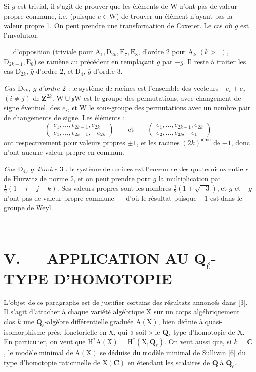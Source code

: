 \documentclass[11pt,leqno]{article}
\newcommand{\Page}[1]{\ifvmode\noindent\else\unskip\ \fi{\footnotesize\textcolor{gray}{[p.\,#1]}}\ \ignorespaces}
\begin{document}
Si \(\bar{g}\) est trivial, il s’agit de prouver que les éléments de \(\mathrm{W}\) n’ont pas de valeur propre commune, i.e. (puisque \(e\in\mathrm{W}\)) de trouver un élément n’ayant pas la valeur propre 1. On peut prendre une transformation de Coxeter. Le cas où \(\bar{g}\) est l’involution

\Page{233}
d’opposition (triviale pour \(\mathrm{A}_1,\mathrm{D}_{2k},\mathrm{E}_7,\mathrm{E}_8\), d’ordre \(2\) pour \(\mathrm{A}_k\) \((k>1)\), \(\mathrm{D}_{2k+1},\mathrm{E}_6\)) se ramène au précédent en remplaçant \(g\) par \(-g\). Il reste à traiter les cas \(\mathrm{D}_{2k}\), \(\bar g\) d’ordre \(2\), et \(\mathrm{D}_4\), \(\bar g\) d’ordre \(3\).

\textit{Cas \(\mathrm{D}_{2k}\), \(\bar g\) d’ordre \(2\)} : le système de racines est l’ensemble des vecteurs \(\pm e_i\pm e_j\) \((i\ne j)\) de \(\mathbf{Z}^{2k}\), \(\mathrm{W}\cup g\mathrm{W}\) est le groupe des permutations, avec changement de signe éventuel, des \(e_i\), et \(\mathrm{W}\) le sous-groupe des permutations avec un nombre pair de changements de signe. Les éléments :
\[
\left(
\begin{array}{l}
e_1,\ldots,e_{2k-1},e_{2k}\\
e_1,\ldots,e_{2k-1},-e_{2k}
\end{array}
\right)
\qquad\text{et}\qquad
\left(
\begin{array}{l}
e_1,\ldots,e_{2k-1},e_{2k}\\
e_2,\ldots,e_{2k},-e_1
\end{array}
\right)
\]
ont respectivement pour valeurs propres \(\pm1\), et les racines \((2k)^{\text{ième}}\) de \(-1\), donc n’ont aucune valeur propre en commun.

\textit{Cas \(\mathrm{D}_4\), \(\bar g\) d’ordre \(3\)} : le système de racines est l’ensemble des quaternions entiers de Hurwitz de norme \(2\), et on peut prendre pour \(g\) la multiplication par \(\frac{1}{2}(1+i+j+k)\). Ses valeurs propres sont les nombres \(\frac{1}{2}(1\pm\sqrt{-3})\), et \(g\) et \(-g\) n’ont pas de valeur propre commune — d’où le résultat puisque \(-1\) est dans le groupe de Weyl.

\Page{234}
\section*{\normalfont V. — APPLICATION AU \(\mathbf{Q}_{\ell}\)-TYPE D’HOMOTOPIE}

L’objet de ce paragraphe est de justifier certains des résultats annoncés dans [3]. Il s’agit d’attacher à chaque variété algébrique \(\mathrm{X}\) sur un corps algébriquement clos \(k\) une \(\mathbf{Q}_{\ell}\)-algèbre différentielle graduée \(\mathrm{A}(\mathrm{X})\), bien définie à quasi-isomorphisme près, fonctorielle en \(\mathrm{X}\), qui « soit » le \(\mathbf{Q}_{\ell}\)-type d’homotopie de \(\mathrm{X}\). En particulier, on veut que \(\mathrm{H}^*\mathrm{A}(\mathrm{X})=\mathrm{H}^*(\mathrm{X},\mathbf{Q}_{\ell})\). On veut aussi que, si \(k=\mathbf{C}\), le modèle minimal de \(\mathrm{A}(\mathrm{X})\) se déduise du modèle minimal de Sullivan [6] du type d’homotopie rationnelle de \(\mathrm{X}(\mathbf{C})\) en étendant les scalaires de \(\mathbf{Q}\) à \(\mathbf{Q}_{\ell}\).
\end{document}
